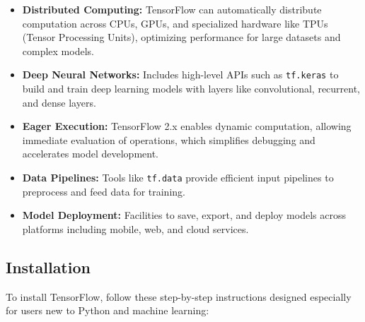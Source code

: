 \begin{itemize}
	\item \textbf{Distributed Computing:} TensorFlow can automatically distribute computation across CPUs, GPUs, and specialized hardware like TPUs (Tensor Processing Units), optimizing performance for large datasets and complex models.
	\item \textbf{Deep Neural Networks:} Includes high-level APIs such as \texttt{tf.keras} to build and train deep learning models with layers like convolutional, recurrent, and dense layers.
	\item \textbf{Eager Execution:} TensorFlow 2.x enables dynamic computation, allowing immediate evaluation of operations, which simplifies debugging and accelerates model development.
	\item \textbf{Data Pipelines:} Tools like \texttt{tf.data} provide efficient input pipelines to preprocess and feed data for training.
	\item \textbf{Model Deployment:} Facilities to save, export, and deploy models across platforms including mobile, web, and cloud services.
\end{itemize}

\subsection{Installation}
To install TensorFlow, follow these step-by-step instructions designed especially for users new to Python and machine learning:

